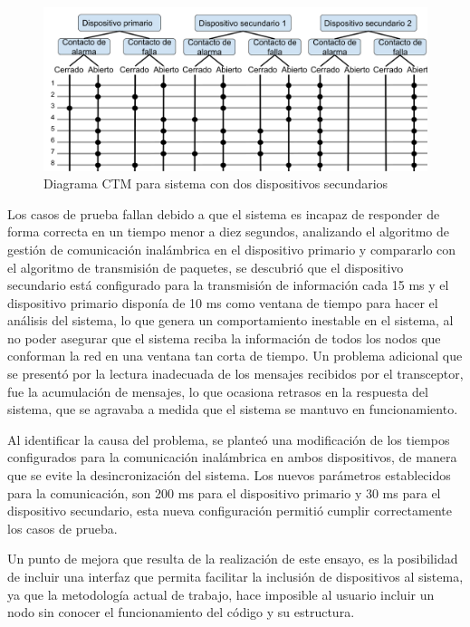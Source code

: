 \begin{figure}[ht]
	\centering
	\includegraphics[scale=.3]{./Figures/Capitulo4/Figura_L.png}
	\caption{Diagrama CTM para sistema con dos dispositivos secundarios}
	\label{fig:figura_l}
\end{figure}

Los casos de prueba fallan debido a que el sistema es incapaz de responder de forma correcta en un tiempo menor a diez segundos, analizando el algoritmo de gestión de comunicación inalámbrica en el dispositivo primario y compararlo con el algoritmo de transmisión de paquetes, se descubrió que el dispositivo secundario está configurado para la transmisión de información cada 15 ms y el dispositivo primario disponía de 10 ms como ventana de tiempo para hacer el análisis del sistema,  lo que genera un comportamiento inestable en el sistema, al no poder asegurar que el sistema reciba la información de todos los nodos que conforman la red en una ventana tan corta de tiempo.
Un problema adicional que se presentó por la lectura inadecuada de los mensajes recibidos por el transceptor, fue la acumulación de mensajes, lo que ocasiona retrasos en la respuesta del sistema, que se agravaba a medida que el sistema se mantuvo en funcionamiento.

 Al identificar la causa del problema, se planteó una modificación de los tiempos configurados para la comunicación inalámbrica en ambos dispositivos, de manera que se evite la desincronización del sistema. Los nuevos parámetros establecidos para la comunicación, son 200 ms para el dispositivo primario y 30 ms para el dispositivo secundario, esta nueva configuración permitió cumplir correctamente los casos de prueba. 
      
Un punto de mejora que resulta de la realización de este ensayo, es la posibilidad de incluir una interfaz que permita facilitar la inclusión de dispositivos al sistema, ya que la metodología actual de trabajo, hace imposible al usuario incluir un nodo sin conocer el funcionamiento del código y su estructura.



